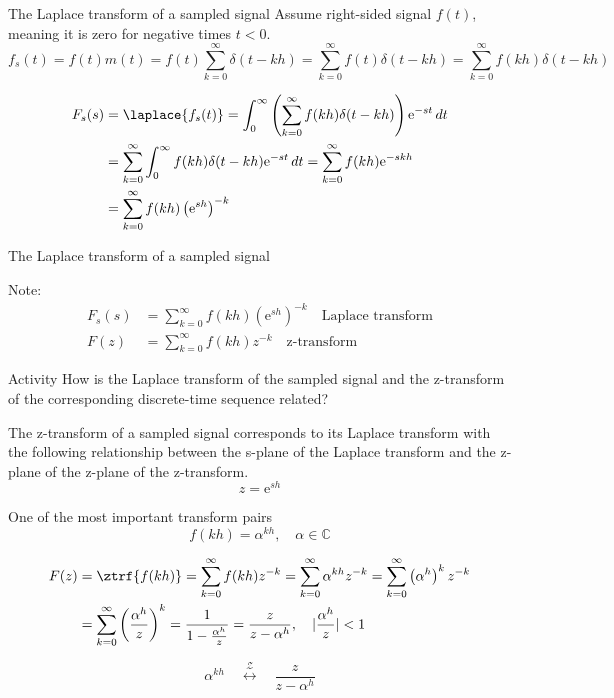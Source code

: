 \documentclass[presentation,aspectratio=169]{beamer}
\begin{document}
\begin{frame}[label={sec:orgda2f547}]{The Laplace transform of a sampled signal}
Assume right-sided signal \(f(t)\), meaning it is zero for negative times \(t<0\).
\[f_s(t) = f(t)m(t) = f(t) \sum_{k=0}^{\infty} \delta(t-kh) = \sum_{k=0}^{\infty} f(t)\delta(t-kh) = \sum_{k=0}^{\infty} f(kh) \delta(t-kh) \]

\pause

\begin{align*}
F_s(s) &= \laplace{f_s(t)} = \int_0^\infty \left(\sum_{k=0}^{\infty} f(kh) \delta(t-kh)\right)\mathrm{e}^{-st}\, dt \\
&= \sum_{k=0}^{\infty} \int_0^\infty  f(kh) \delta(t-kh) \mathrm{e}^{-st}\, dt = \sum_{k=0}^{\infty} f(kh) \mathrm{e}^{-skh}\\
&= \sum_{k=0}^{\infty} f(kh) \left(\mathrm{e}^{sh}\right)^{-k}
\end{align*}
\end{frame}

\begin{frame}[label={sec:org5996013}]{The Laplace transform of a sampled signal}
\small

Note:
\begin{align*}
F_s(s) &=  \sum_{k=0}^{\infty} f(kh) \left(\mathrm{e}^{sh}\right)^{-k}\quad \text{Laplace transform}\\
F(z) &= \sum_{k=0}^{\infty} f(kh) z^{-k} \quad \text{z-transform}
\end{align*}

\alert{Activity} How is the Laplace transform of the sampled signal and the z-transform of the corresponding discrete-time sequence related?

\pause

\begin{tcolorbox}
 The z-transform of a sampled signal corresponds to its Laplace transform with the following relationship between the s-plane of the Laplace transform and the z-plane of the z-plane of the z-transform.
\[ z = \mathrm{e}^{sh}\]
\end{tcolorbox}
\end{frame}


\begin{frame}[label={sec:org245ad09}]{One of the most important transform pairs}
\[f(kh) = \alpha^{kh}, \quad \alpha \in \mathbb{C}\]

\pause

\begin{align*}
   F(z) &= \ztrf{f(kh)} = \sum_{k=0}^{\infty} f(kh)z^{-k}
   =  \sum_{k=0}^{\infty} \alpha^{kh}z^{-k} =  \sum_{k=0}^{\infty} \left(\alpha^{h}\right)^kz^{-k}\\
   &=  \sum_{k=0}^{\infty} \left(\frac{\alpha^{h}}{z}\right)^{k}
   =  \frac{1}{1 - \frac{\alpha^h}{z}} = \frac{z}{z-\alpha^{h}}, \quad |\frac{\alpha^h}{z}| < 1
\end{align*}

\pause

\begin{tcolorbox}
\[ \alpha^{kh} \quad  \overset{\mathcal{Z}}{\longleftrightarrow} \quad \frac{z}{z-\alpha^h} \]
\end{tcolorbox}
\end{frame}
\end{document}
